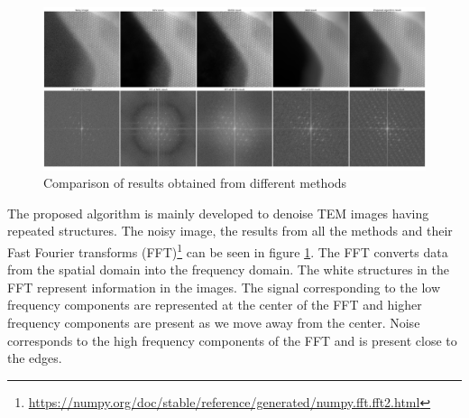 \documentclass[fleqn,10pt]{wlscirep}
\begin{document}
	\begin{figure}
		\centering
		\includegraphics[scale=0.09]{./imgs/comparison.jpg}
		\caption{Comparison of results obtained from different methods}
		\label{fig:comparison}
	\end{figure}
	
	
	The proposed algorithm is mainly developed to denoise TEM images having repeated structures. The noisy image, the results from all the methods and their Fast Fourier transforms (FFT)\footnote{\url{https://numpy.org/doc/stable/reference/generated/numpy.fft.fft2.html}} can be seen in figure \ref{fig:comparison}. The FFT converts data from the spatial domain into the frequency domain. The white structures in the FFT represent information in the images. The signal corresponding to the low frequency components are represented at the center of the FFT and higher frequency components are present as we move away from the center. Noise corresponds to the high frequency components of the FFT and is present close to the edges.
	
\end{document}

